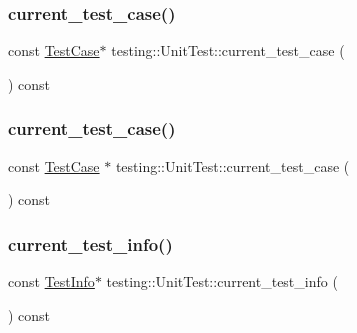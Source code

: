 \subsubsection{\texorpdfstring{current\_test\_case()}{current\_test\_case()}\hspace{0.1cm}{\footnotesize\ttfamily [2/3]}}
{\footnotesize\ttfamily const \mbox{\hyperlink{classtesting_1_1_test_case}{Test\+Case}}$\ast$ testing\+::\+Unit\+Test\+::current\+\_\+test\+\_\+case (\begin{DoxyParamCaption}{ }\end{DoxyParamCaption}) const}

\mbox{\label{classtesting_1_1_unit_test_a2bf61896036ae03edbd7bceed14f9e18}} 
\subsubsection{\texorpdfstring{current\_test\_case()}{current\_test\_case()}\hspace{0.1cm}{\footnotesize\ttfamily [3/3]}}
{\footnotesize\ttfamily const \mbox{\hyperlink{classtesting_1_1_test_case}{Test\+Case}} $\ast$ testing\+::\+Unit\+Test\+::current\+\_\+test\+\_\+case (\begin{DoxyParamCaption}{ }\end{DoxyParamCaption}) const}

\mbox{\label{classtesting_1_1_unit_test_a02b6ab72bb9d93805bd0efbb099b4ccc}} 
\subsubsection{\texorpdfstring{current\_test\_info()}{current\_test\_info()}\hspace{0.1cm}{\footnotesize\ttfamily [1/3]}}
{\footnotesize\ttfamily const \mbox{\hyperlink{classtesting_1_1_test_info}{Test\+Info}}$\ast$ testing\+::\+Unit\+Test\+::current\+\_\+test\+\_\+info (\begin{DoxyParamCaption}{ }\end{DoxyParamCaption}) const}

